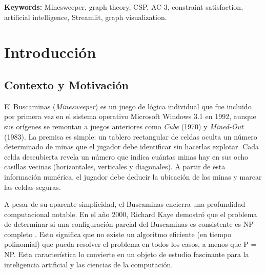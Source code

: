 \documentclass[12pt,a4paper]{article}
\begin{document}
\begin{abstract}
Beyond the algorithmic core, the system incorporates gamification features such as a ranking system (Bronze, Silver, Gold) based on win rate and number of games played, a podium of best times by difficulty, and persistent game history in JSON format with export capability. The project includes 13 unit tests verifying the correct operation of each module.
\end{abstract}

\vspace{0.5cm}
\noindent\textbf{Keywords:} Minesweeper, graph theory, CSP, AC-3, constraint satisfaction, artificial intelligence, Streamlit, graph visualization.

\newpage

\tableofcontents
\newpage

\listoffigures
\listoftables
\newpage

\section{Introducción}

\subsection{Contexto y Motivación}

El Buscaminas (\textit{Minesweeper}) es un juego de lógica individual que fue incluido por primera vez en el sistema operativo Microsoft Windows 3.1 en 1992, aunque sus orígenes se remontan a juegos anteriores como \textit{Cube} (1970) y \textit{Mined-Out} (1983). La premisa es simple: un tablero rectangular de celdas oculta un número determinado de minas que el jugador debe identificar sin hacerlas explotar. Cada celda descubierta revela un número que indica cuántas minas hay en sus ocho casillas vecinas (horizontales, verticales y diagonales). A partir de esta información numérica, el jugador debe deducir la ubicación de las minas y marcar las celdas seguras.

A pesar de su aparente simplicidad, el Buscaminas encierra una profundidad computacional notable. En el año 2000, Richard Kaye demostró que el problema de determinar si una configuración parcial del Buscaminas es consistente es NP-completo \cite{kaye2000minesweeper}. Esto significa que no existe un algoritmo eficiente (en tiempo polinomial) que pueda resolver el problema en todos los casos, a menos que P = NP. Esta característica lo convierte en un objeto de estudio fascinante para la inteligencia artificial y las ciencias de la computación.
\end{document}
